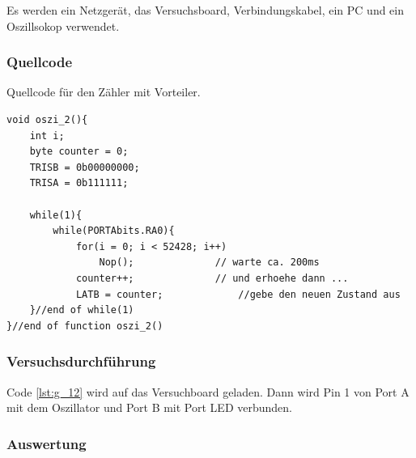 \documentclass[12pt,a4paper]{article}
\begin{document}
Es werden ein Netzgerät, das Versuchsboard, Verbindungskabel, ein PC und ein Oszillsokop verwendet.

\subsubsection*{Quellcode}

Quellcode für den Zähler mit Vorteiler.

\lstset{language=C, basicstyle=\tiny}
\begin{lstlisting}[caption = {Zähler mit Vorteiler}, label=lst:g_12,captionpos=b]
void oszi_2(){
	int i;
	byte counter = 0;
	TRISB = 0b00000000;
	TRISA = 0b111111;
	
	while(1){
		while(PORTAbits.RA0){
			for(i = 0; i < 52428; i++)
				Nop();				// warte ca. 200ms
			counter++;				// und erhoehe dann ...
			LATB = counter;				//gebe den neuen Zustand aus
	}//end of while(1)
}//end of function oszi_2()
\end{lstlisting}

\subsubsection*{Versuchsdurchführung}

Code \ref{lst:g_12} wird auf das Versuchboard geladen. Dann wird Pin 1 von Port A mit dem Oszillator und Port B mit Port LED verbunden.


\subsubsection*{Auswertung}
\end{document}
